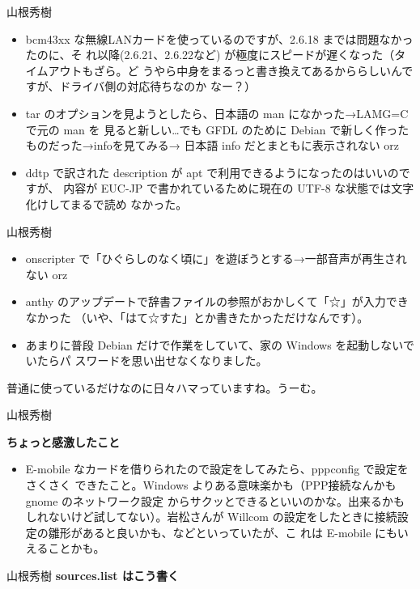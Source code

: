 \documentclass[cjk,dvipdfmx,12pt]{beamer}
\begin{document}
\begin{frame}{山根秀樹}
\begin{itemize}
 \item bcm43xx な無線LANカードを使っているのですが、2.6.18 までは問題なかったのに、そ
 れ以降(2.6.21、2.6.22など) が極度にスピードが遅くなった（タイムアウトもざら。ど
 うやら中身をまるっと書き換えてあるかららしいんですが、ドライバ側の対応待ちなのか
 なー？）
 \item tar のオプションを見ようとしたら、日本語の man になかった→LAMG=C で元の man を
 見ると新しい…でも GFDL のために Debian で新しく作ったものだった→infoを見てみる→
 日本語 info だとまともに表示されない orz
 \item ddtp で訳された description が apt で利用できるようになったのはいいのですが、
 内容が EUC-JP で書かれているために現在の UTF-8 な状態では文字化けしてまるで読め
 なかった。
\end{itemize}
\end{frame}\begin{frame}{山根秀樹}
\begin{itemize}
 \item onscripter で「ひぐらしのなく頃に」を遊ぼうとする→一部音声が再生されない orz
 \item anthy のアップデートで辞書ファイルの参照がおかしくて「☆」が入力できなかった
 （いや、「はて☆すた」とか書きたかっただけなんです）。
 \item あまりに普段 Debian だけで作業をしていて、家の Windows を起動しないでいたらパ
 スワードを思い出せなくなりました。
\end{itemize}

普通に使っているだけなのに日々ハマっていますね。うーむ。

\end{frame}\begin{frame}{山根秀樹}

\textbf{ちょっと感激したこと}

\begin{itemize}
 \item  E-mobile なカードを借りられたので設定をしてみたら、pppconfig で設定をさくさく
 できたこと。Windows よりある意味楽かも（PPP接続なんかも gnome のネットワーク設定
 からサクッとできるといいのかな。出来るかもしれないけど試してない）。岩松さんが
 Willcom の設定をしたときに接続設定の雛形があると良いかも、などといっていたが、こ
 れは E-mobile にもいえることかも。
\end{itemize}


\end{frame}\begin{frame}[containsverbatim]{山根秀樹}
\textbf{sources.list はこう書く}


\end{frame}
\end{document}

